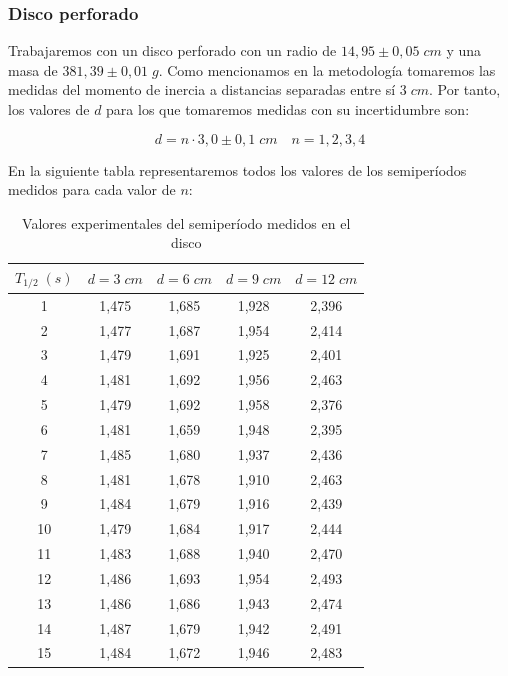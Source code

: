 \documentclass[a4paper,12pt,titlepage]{article}
\begin{document}
\subsubsection{Disco perforado}

Trabajaremos con un disco perforado con un radio de $14,95 \pm 0,05 \; cm$ y una masa de $381,39 \pm 0,01 \;g$. Como mencionamos en la metodología tomaremos las medidas del momento de inercia a distancias separadas entre sí $3\;cm$. Por tanto, los valores de $d$ para los que tomaremos medidas con su incertidumbre son:

\begin{equation}
    d = n\cdot 3,0 \pm 0,1 \; cm \quad n=1,2,3,4
\end{equation}

En la siguiente tabla representaremos todos los valores de los semiperíodos medidos para cada valor de $n$:

\begin{table}[]
    \centering
    \begin{tabular}{|c|c|c|c|c|}
    \hline
    $T_{1/2} \; (s)$ &$d=3 \; cm$ & $d=6 \;cm$ & $d=9 \; cm$ & $d=12 \; cm$ \\ \hline
    1  & 1,475 & 1,685 & 1,928 & 2,396 \\ \hline
    2  & 1,477 & 1,687 & 1,954 & 2,414 \\ \hline
    3  & 1,479 & 1,691 & 1,925 & 2,401 \\ \hline
    4  & 1,481 & 1,692 & 1,956 & 2,463 \\ \hline
    5  & 1,479 & 1,692 & 1,958 & 2,376 \\ \hline
    6  & 1,481 & 1,659 & 1,948 & 2,395 \\ \hline
    7  & 1,485 & 1,680 & 1,937 & 2,436 \\ \hline
    8  & 1,481 & 1,678 & 1,910 & 2,463 \\ \hline
    9  & 1,484 & 1,679 & 1,916 & 2,439 \\ \hline
    10 & 1,479 & 1,684 & 1,917 & 2,444 \\ \hline
    11 & 1,483 & 1,688 & 1,940 & 2,470 \\ \hline
    12 & 1,486 & 1,693 & 1,954 & 2,493 \\ \hline
    13 & 1,486 & 1,686 & 1,943 & 2,474 \\ \hline
    14 & 1,487 & 1,679 & 1,942 & 2,491 \\ \hline
    15 & 1,484 & 1,672 & 1,946 & 2,483 \\ \hline
    \end{tabular}
    \caption{Valores experimentales del semiperíodo medidos en el disco}
    \label{semiT Steiner1}
    \end{table}
\end{document}

